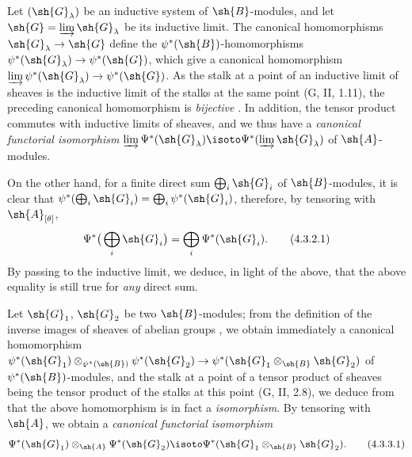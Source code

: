 \begin{env}[4.3.2]
\label{0.4.3.2}
Let $(\sh{G}_\lambda)$ be an inductive system of $\sh{B}$-modules, and let
$\sh{G}=\varinjlim\sh{G}_\lambda$ be its inductive limit. The canonical
homomorphisms $\sh{G}_\lambda\to\sh{G}$ define the
$\psi^*(\sh{B})$-homomorphisms $\psi^*(\sh{G}_\lambda)\to\psi^*(\sh{G})$, which
give a canonical homomorphism
$\varinjlim\psi^*(\sh{G}_\lambda)\to\psi^*(\sh{G})$. As the stalk at a point of
an inductive limit of sheaves is the inductive limit of the stalks at the same
point (G, II, 1.11), the preceding canonical homomorphism is \emph{bijective}
. In addition, the tensor product commutes with inductive
limits of sheaves, and we thus have a \emph{canonical functorial isomorphism}
$\varinjlim\Psi^*(\sh{G}_\lambda)\isoto\Psi^*(\varinjlim\sh{G}_\lambda)$ of
$\sh{A}$-modules.

On the other hand, for a finite direct sum $\bigoplus_i\sh{G}_i$ of
$\sh{B}$-modules, it is clear that
$\psi^*(\bigoplus_i\sh{G}_i)=\bigoplus_i\psi^*(\sh{G}_i)$, therefore, by
tensoring with $\sh{A}_{[\theta]}$,
\[
  \Psi^*\big(\bigoplus_i\sh{G}_i\big)=\bigoplus_i\Psi^*(\sh{G}_i).
  \tag{4.3.2.1}
\]
By passing to the inductive limit, we deduce, in light of the above, that the
above equality is still true for \emph{any} direct sum.
\end{env}

\begin{env}[4.3.3]
\label{0.4.3.3}
Let $\sh{G}_1$, $\sh{G}_2$ be two $\sh{B}$-modules; from the definition of the
inverse images of sheaves of abelian groups , we obtain
immediately a canonical homomorphism
$\psi^*(\sh{G}_1)\otimes_{\psi^*(\sh{B})}\psi^*(\sh{G}_2)
  \to\psi^*(\sh{G}_1\otimes_\sh{B}\sh{G}_2)$ of $\psi^*(\sh{B})$-modules, and
the stalk at a point of a tensor product of sheaves being the tensor product of
the stalks at this point (G, II, 2.8), we deduce from  that the
above homomorphism is in fact a \emph{isomorphism}. By tensoring with $\sh{A}$,
we obtain a \emph{canonical functorial isomorphism}
\[
\label{0.4.3.3.1}
  \Psi^*(\sh{G}_1)\otimes_\sh{A}\Psi^*(\sh{G}_2)
  \isoto\Psi^*(\sh{G}_1\otimes_\sh{B}\sh{G}_2).
  \tag{4.3.3.1}
\]
\end{env}

